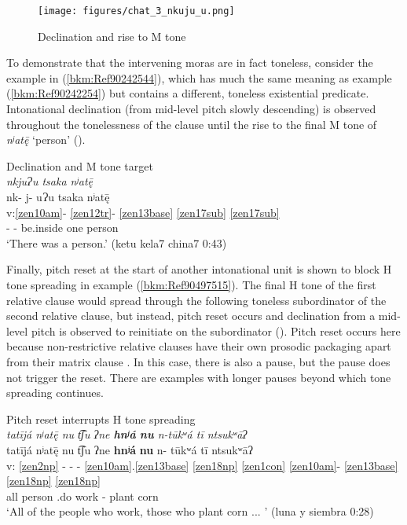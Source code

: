\documentclass[output=paper]{langscibook}
\begin{document}
\begin{figure}[p]
    \centering
    \texttt{[image: figures/chat\_3\_nkuju\_u.png]}
    \caption{Declination and rise to M tone}
    \label{fig:chat:key:3}
\end{figure}

To demonstrate that the intervening moras are in fact toneless, consider the example in (\ref{bkm:Ref90242544}), which has much the same meaning as example (\ref{bkm:Ref90242254}) but contains a different, toneless existential predicate. Intonational declination (from mid-level pitch slowly descending) is observed throughout the tonelessness of the clause until the rise to the final M tone of \textit{nʲatę̄} `person' ().


\ea\label{bkm:Ref90242544}Declination and M tone target\\
\textit{nkjuɁu tsaka nʲatę̄} \\
\glll nk- j- uɁu tsaka nʲatę̄\\
v:\ref{zen10am}{}- \ref{zen12tr}{}- \ref{zen13base} \ref{zen17sub} \ref{zen17sub} \\ 
\Pfv{}- \Itr{}- be.inside one person\\
\glt `There was a person.' (ketu kela7 china7 0:43)
\z

Finally, pitch reset at the start of another intonational unit is shown to block H tone spreading in example (\ref{bkm:Ref90497515}). The final H tone of the first relative clause would spread through the following toneless subordinator of the second relative clause, but instead, pitch reset occurs and declination from a mid-level pitch is observed to reinitiate on the subordinator (). Pitch reset occurs here because non-restrictive relative clauses have their own prosodic packaging apart from their matrix clause \citep{Campbell2021a}. In this case, there is also a pause, but the pause does not trigger the reset. There are examples with longer pauses beyond which tone spreading continues.


\ea\label{bkm:Ref90497515}Pitch reset interrupts H tone spreading\\
\textit{tatījá nʲatę̄ nu t͡ʃu ʔne \textbf{hnʲá} \textbf{nu} n-tūkʷá tī ntsukʷāʔ} \\ 
\glll {} tatījá nʲatę̄ nu t͡ʃu ʔne \textbf{hnʲá} \textbf{nu} n- tūkʷá tī ntsukʷāʔ\\
v: \ref{zen2np} - - - \ref{zen10am}{}.\ref{zen13base} \ref{zen18np} \ref{zen1con} \ref{zen10am}{}- \ref{zen13base} \ref{zen18np} \ref{zen18np} \\ 
{} all person \Sub{} \Hum{} \Hab{}.do work \Sub{} \Hab{}- plant \Tplz{} corn\\
\glt `All of the people who work, those who plant corn ... ' (luna y siembra 0:28)
\z
\end{document}
